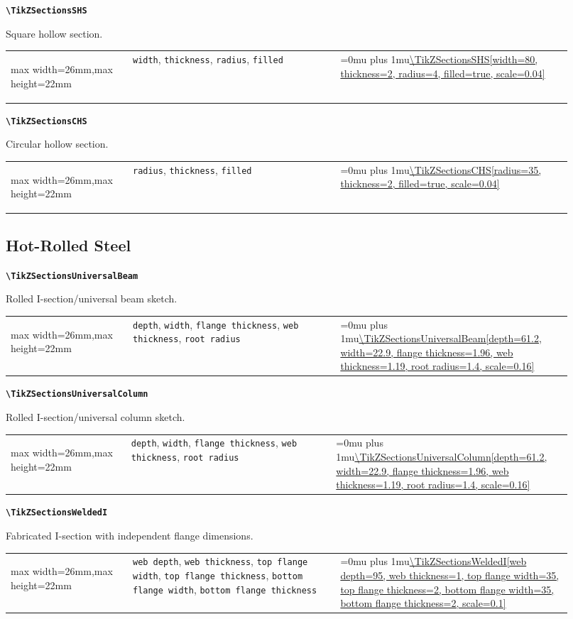 \documentclass[10pt]{article}
\makeatletter
\newcommand{\command}[1]{\texttt{\textbackslash #1}}
\newcommand{\keyname}[1]{\texttt{#1}}
\newcommand{\CodeInline}[1]{%
  \begingroup
  \ttfamily\scriptsize\raggedright\Urlmuskip=0mu plus 1mu\url{#1}%
  \endgroup
}
\newcommand{\ShapePreview}[1]{%
  \begin{center}
  \begin{adjustbox}{max width=26mm,max height=22mm}
    \begin{tikzpicture}
      #1
    \end{tikzpicture}
  \end{adjustbox}
  \end{center}
}
\newcommand{\ReferenceRow}[6]{%
  \textbf{\command{#1}}\par
  #2\par
  \vspace{2pt}
  \begin{tabular}{@{}p{0.20\linewidth}p{0.34\linewidth}p{0.38\linewidth}@{}}
    #6 & \footnotesize #3 & \CodeInline{#4}
  \end{tabular}
  \par\vspace{4mm}
}
\makeatother
\begin{document}
\ReferenceRow
  {TikZSectionsSHS}
  {Square hollow section.}
  {\keyname{width}, \keyname{thickness}, \keyname{radius}, \keyname{filled}}
  {\TikZSectionsSHS[width=80, thickness=2, radius=4, filled=true, scale=0.04]}
  {}
  {\ShapePreview{\TikZSectionsSHS[width=80, thickness=2, radius=4, filled=true, scale=0.04]}}

\ReferenceRow
  {TikZSectionsCHS}
  {Circular hollow section.}
  {\keyname{radius}, \keyname{thickness}, \keyname{filled}}
  {\TikZSectionsCHS[radius=35, thickness=2, filled=true, scale=0.04]}
  {}
  {\ShapePreview{\TikZSectionsCHS[radius=35, thickness=2, filled=true, scale=0.04]}}

\subsection{Hot-Rolled Steel}

\ReferenceRow
  {TikZSectionsUniversalBeam}
  {Rolled I-section/universal beam sketch.}
  {\keyname{depth}, \keyname{width}, \keyname{flange thickness}, \keyname{web thickness}, \keyname{root radius}}
  {\TikZSectionsUniversalBeam[depth=61.2, width=22.9, flange thickness=1.96, web thickness=1.19, root radius=1.4, scale=0.16]}
  {}
  {\ShapePreview{\TikZSectionsUniversalBeam[depth=61.2, width=22.9, flange thickness=1.96, web thickness=1.19, root radius=1.4, scale=0.16]}}

\ReferenceRow
  {TikZSectionsUniversalColumn}
  {Rolled I-section/universal column sketch.}
  {\keyname{depth}, \keyname{width}, \keyname{flange thickness}, \keyname{web thickness}, \keyname{root radius}}
  {\TikZSectionsUniversalColumn[depth=61.2, width=22.9, flange thickness=1.96, web thickness=1.19, root radius=1.4, scale=0.16]}
  {}
  {\ShapePreview{\TikZSectionsUniversalColumn[depth=61.2, width=22.9, flange thickness=1.96, web thickness=1.19, root radius=1.4, scale=0.16]}}

\ReferenceRow
  {TikZSectionsWeldedI}
  {Fabricated I-section with independent flange dimensions.}
  {\keyname{web depth}, \keyname{web thickness}, \keyname{top flange width}, \keyname{top flange thickness}, \keyname{bottom flange width}, \keyname{bottom flange thickness}}
  {\TikZSectionsWeldedI[web depth=95, web thickness=1, top flange width=35, top flange thickness=2, bottom flange width=35, bottom flange thickness=2, scale=0.1]}
  {}
  {\ShapePreview{\TikZSectionsWeldedI[web depth=95, web thickness=1, top flange width=35, top flange thickness=2, bottom flange width=35, bottom flange thickness=2, scale=0.1]}}
\end{document}

